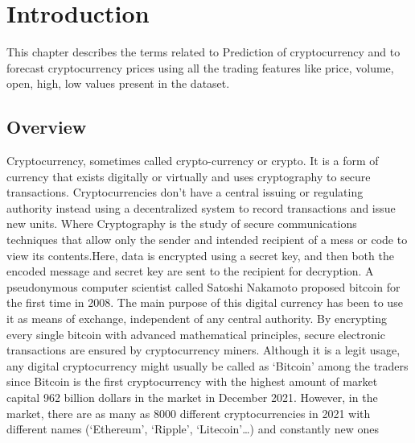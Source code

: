 \documentclass[openany,12pt]{report}
\begin{document}

\chapter{Introduction}
This chapter describes the terms related to Prediction of cryptocurrency and to forecast cryptocurrency prices using all the trading features
like price, volume, open, high, low values present in the dataset. \\
\section{Overview}
Cryptocurrency, sometimes called crypto-currency or crypto. It is a form of currency that exists digitally or virtually and uses cryptography to secure transactions. Cryptocurrencies don't have a central issuing or regulating authority instead using a decentralized system to record transactions and issue new units.
Where Cryptography is the study of secure communications techniques that allow only the sender and intended recipient of a mess or code to view its contents.Here, data is encrypted using a secret key, and then both the encoded message and secret key are sent to the recipient for decryption.
A pseudonymous computer scientist called Satoshi Nakamoto proposed bitcoin for the first time in 2008. The main purpose of this digital currency has been to use it as means of exchange, independent of any central authority. By encrypting every single bitcoin with advanced mathematical principles, secure electronic transactions are ensured by cryptocurrency miners. Although it is a legit usage, any digital cryptocurrency might usually be called as ‘Bitcoin’ among the traders since Bitcoin is the first cryptocurrency with the highest amount of market capital 962 billion dollars in the market in December 2021. However, in the market, there are as many as 8000 different cryptocurrencies in 2021 with different names (‘Ethereum’, ‘Ripple’, ‘Litecoin’…) and constantly new ones
\end{document}
